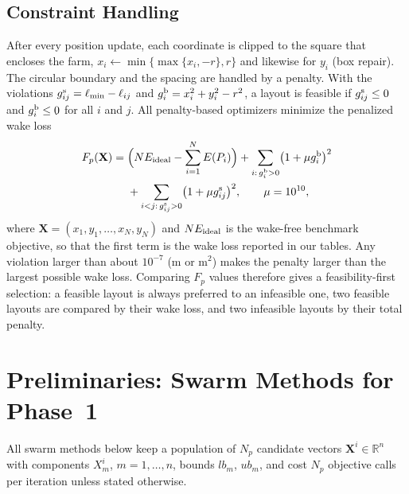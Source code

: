 \documentclass[journal,twoside]{IEEEtran}
\begin{document}
\subsection{Constraint Handling}
\label{sec:constraints}
After every position update, each coordinate is clipped to the square that encloses the farm, $x_i\leftarrow\min\{\max\{x_i,-r\},r\}$ and likewise for $y_i$ (box repair). The circular boundary and the spacing are handled by a penalty. With the violations
$g^{\rm s}_{ij}=\ell_{\min}-\ell_{ij}$ and $g^{\rm b}_{i}=x_i^2+y_i^2-r^2$,
a layout is feasible if $g^{\rm s}_{ij}\le0$ and $g^{\rm b}_i\le0$ for all $i$ and $j$. All penalty-based optimizers minimize the penalized wake loss
\begin{equation}
\begin{split}
F_p(\mathbf X)={}&\Bigl(N E_{\rm ideal}-\sum_{i=1}^{N}E(P_i)\Bigr)+\sum_{i:\,g^{\rm b}_i>0}\bigl(1+\mu g^{\rm b}_i\bigr)^2\\
&+\sum_{i<j:\,g^{\rm s}_{ij}>0}\bigl(1+\mu g^{\rm s}_{ij}\bigr)^2,\qquad \mu=10^{10},
\end{split}
\label{eq:penalty}
\end{equation}
where $\mathbf X=(x_1,y_1,\ldots,x_N,y_N)$ and $N E_{\rm ideal}$ is the wake-free benchmark objective, so that the first term is the wake loss reported in our tables. Any violation larger than about $10^{-7}$ (m or m$^2$) makes the penalty larger than the largest possible wake loss. Comparing $F_p$ values therefore gives a feasibility-first selection: a feasible layout is always preferred to an infeasible one, two feasible layouts are compared by their wake loss, and two infeasible layouts by their total penalty.

\section{Preliminaries: Swarm Methods for Phase~1}
\label{sec:prelim}
All swarm methods below keep a population of $N_p$ candidate vectors $\mathbf X^i\in\mathbb R^{n}$ with components $X^i_m$, $m=1,\ldots,n$, bounds $lb_m$, $ub_m$, and cost $N_p$ objective calls per iteration unless stated otherwise.
\end{document}
